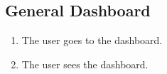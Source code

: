 \subsection{General Dashboard}

\begin{enumerate}
    \item The user goes to the dashboard.
    \item The user sees the dashboard.
\end{enumerate}

